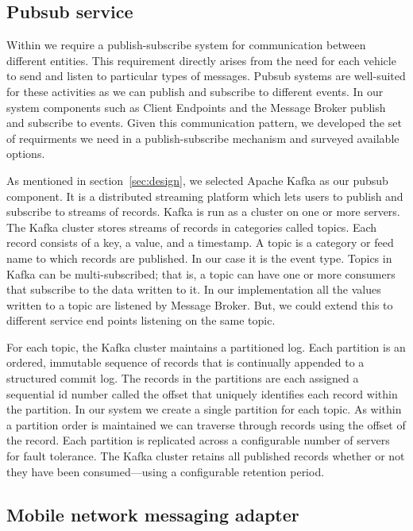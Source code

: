 \subsection{Pubsub service}

Within \name{} we require a publish-subscribe system for communication
between different entities.  This requirement directly arises from the
need for each vehicle to send and listen to particular types of
messages. Pubsub systems are well-suited for these activities as we
can publish and subscribe to different events. In our system
components such as Client Endpoints and the Message Broker publish and
subscribe to events.  Given this communication pattern, we developed
the set of requirments we need in a publish-subscribe mechanism and
surveyed available options.

As mentioned in section~\ref{sec:design}, we selected Apache Kafka as our pubsub
component. It is a distributed streaming platform which lets users to publish 
and subscribe to streams of records. Kafka is run as a cluster on one or more 
servers. The Kafka cluster stores streams of records in categories called topics.
Each record consists of a key, a value, and a timestamp. A topic is a category 
or feed name to which records are published. In our case it is the event type.
Topics in Kafka can be multi-subscribed; that is, a topic can have one or more 
consumers that subscribe to the data written to it. In our implementation
all the values written to a topic are listened by Message Broker. But, we could
extend this to different service end points listening on the same topic.

For each topic, the Kafka cluster maintains a partitioned log. Each partition 
is an ordered, immutable sequence of records that is continually appended to a 
structured commit log. The records in the partitions are each assigned a 
sequential id number called the offset that uniquely identifies each record 
within the partition. In our system we create a single partition for each topic.
As within a partition order is maintained we can traverse through records using
the offset of the record. Each partition is replicated across a configurable
number of servers for fault tolerance. The Kafka cluster retains all published 
records whether or not they have been consumed—using a configurable retention 
period.

\subsection{Mobile network messaging adapter}

